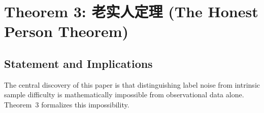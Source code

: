 
\section{Theorem 3: 老实人定理 (The Honest Person Theorem)}
\label{sec:thm3}

\subsection{Statement and Implications}
\label{sec:thm3_statement}

The central discovery of this paper is that distinguishing label noise from
intrinsic sample difficulty is mathematically impossible from observational data
alone.  Theorem~3 formalizes this impossibility.

